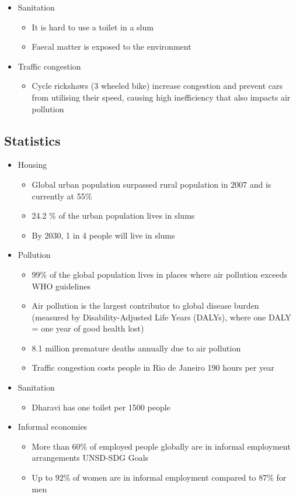 \begin{itemize}
		\item Sanitation
			\begin{itemize}
				\item It is hard to use a toilet in a slum
				\item Faecal matter is exposed to the environment
			\end{itemize}
		\item Traffic congestion
			\begin{itemize}
				\item Cycle rickshaws (3 wheeled bike) increase congestion and prevent cars from utilising their speed, causing high inefficiency that also impacts air pollution
			\end{itemize}
	\end{itemize}


	\subsection{Statistics}
		\begin{itemize}
			\item Housing
				\begin{itemize}
					\item Global urban population surpassed rural population in 2007 and is currently at 55\%
					\item 24.2 \% of the urban population lives in slums
					\item By 2030, 1 in 4 people will live in slums
				\end{itemize}

			\item Pollution
				\begin{itemize}
					\item 99\% of the global population lives in places where air pollution exceeds WHO guidelines
					\item Air pollution is the largest contributor to global disease burden (measured by Disability-Adjusted Life Years (DALYs), where one DALY = one year of good health lost)
					\item 8.1 million premature deaths annually due to air pollution
					\item Traffic congestion costs people in Rio de Janeiro 190 hours per year
				\end{itemize}
			\item Sanitation
				\begin{itemize}
					\item Dharavi has one toilet per 1500 people
				\end{itemize}
			\item Informal economies
				\begin{itemize}
					\item More than 60\% of employed people globally are in informal employment arrangements UNSD-SDG Goals
					\item Up to 92\% of women are in informal employment compared to 87\% for men
				\end{itemize}
		\end{itemize}

